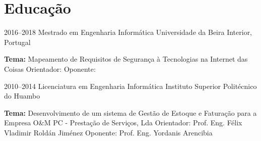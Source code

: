 \section{Educação}

\begin{entrada}


\lista
{2016--2018}
{Mestrado {\normalfont em Engenharia Informática }}
{Universidade da Beira Interior, Portugal}
{\vspace{-0.3cm}}

\dissert
{}
{\textbf{Tema:} Mapeamento de Requisitos de Segurança à Tecnologias na Internet das Coisas}
{Orientador: {\normalfont {}}}
{Oponente: {\normalfont {}}}
{\vspace{-0.3cm}}



\lista
{2010--2014}
{Licenciatura {\normalfont em Engenharia Informática }}
{Instituto Superior Politécnico do Huambo}
{\vspace{-0.3cm}}

\dissert
{}
{\textbf{Tema:} Desenvolvimento de um sistema de Gestão de Estoque e Faturação para a Empresa O\&M PC - Prestação de Serviços, Lda}
{Orientador: {\normalfont Prof. Eng. Félix Vladimir Roldán Jiménez}}
{Oponente: {\normalfont Prof. Eng. Yordanis Arencibia}}
{\vspace{-0.3cm}}

\end{entrada}

